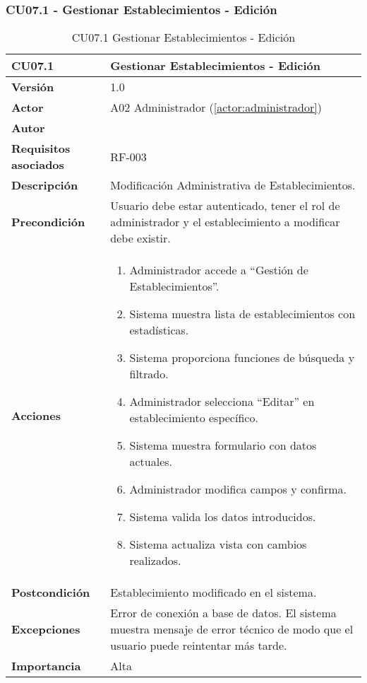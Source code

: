 \subsubsection{CU07.1 - Gestionar Establecimientos - Edición}

\begin{table}[H]
	\centering
	\begin{tabularx}{\linewidth}{ p{} p{} }
		\toprule
		\textbf{CU07.1}    & \textbf{Gestionar Establecimientos - Edición} \\
		\toprule
		\textbf{Versión}              & 1.0    \\
		\textbf{Actor}                & A02 Administrador (\ref{actor:administrador}) \\
		\textbf{Autor}                & \nombre \\
		\textbf{Requisitos asociados} & RF-003 \\
		\textbf{Descripción}          & Modificación Administrativa de Establecimientos. \\
		\textbf{Precondición}         & Usuario debe estar autenticado, tener el rol de administrador y el establecimiento a modificar debe existir. \\
		\textbf{Acciones}             &
		\begin{enumerate}
			\def\labelenumi{\arabic{enumi}.}
			\tightlist
			\item Administrador accede a ``Gestión de Establecimientos''.
            \item Sistema muestra lista de establecimientos con estadísticas.
            \item Sistema proporciona funciones de búsqueda y filtrado.
            \item Administrador selecciona ``Editar'' en establecimiento específico.
 	    \item Sistema muestra formulario con datos actuales.
            \item Administrador modifica campos y confirma.
            \item Sistema valida los datos introducidos.
            \item Sistema actualiza vista con cambios realizados.
		\end{enumerate}\\
		\textbf{Postcondición}        & Establecimiento modificado en el sistema.\\
		\textbf{Excepciones}          & Error de conexión a base de datos. El sistema muestra mensaje de error técnico de modo que el usuario puede reintentar más tarde.\\
		\textbf{Importancia}          & Alta \\
		\bottomrule
	\end{tabularx}
	\caption{CU07.1 Gestionar Establecimientos - Edición}
	\label{cu:gestionar-establecimientos-edicion}
\end{table}

